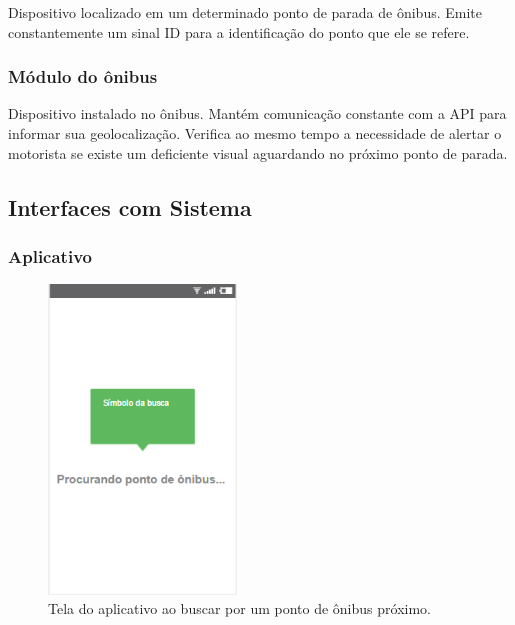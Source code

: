 \documentclass[
	12pt,				%
	oneside,			%
	a4paper,			%
	brazil				%
]{abntex2}
\begin{document}
Dispositivo localizado em um determinado ponto de parada de ônibus. Emite constantemente um sinal ID para a identificação do ponto que ele se refere.

\subsubsection{Módulo do ônibus}

Dispositivo instalado no ônibus. Mantém comunicação constante com a API para informar sua geolocalização. Verifica ao mesmo tempo a necessidade de alertar o motorista se existe um deficiente visual aguardando no próximo ponto de parada.

\newpage

\subsection{Interfaces com Sistema}

\subsubsection{Aplicativo}


\begin{figure}[!h]
\centering
\includegraphics[width=5cm, center]{images/tela-1-buscando-beacon.PNG}
\caption{Tela do aplicativo ao buscar por um ponto de ônibus próximo.}
\label{Rotulo}
\end{figure}
\end{document}
